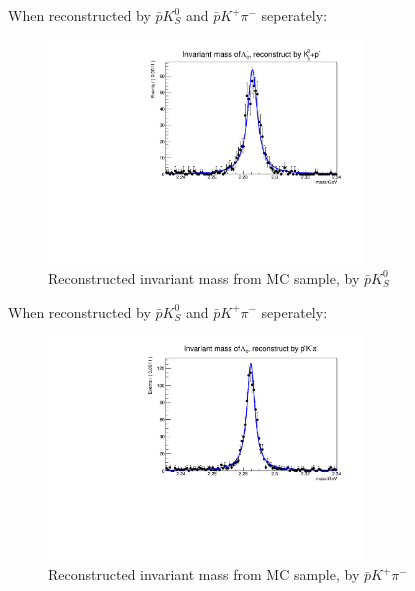 \documentclass{beamer}
\begin{document}
\begin{frame}
    When reconstructed by $\bar{p} K^0_S$ and $\bar{p} K^+ \pi^-$ seperately:
    \begin{figure}
        \centering
        \includegraphics[width = 0.75\textwidth]{k0p.pdf}
        \caption{Reconstructed invariant mass from MC sample, by $\bar{p} K^0_S$ }
        \label{fig: mBC data}
    \end{figure}
\end{frame}

\begin{frame}
    When reconstructed by $\bar{p} K^0_S$ and $\bar{p} K^+ \pi^-$ seperately:
    \begin{figure}
        \centering
        \includegraphics[width = 0.75\textwidth]{unnamed.pdf}
        \caption{Reconstructed invariant mass from MC sample, by $\bar{p} K^+ \pi^-$ }
        \label{fig: mBC data}
    \end{figure}
\end{frame}
\end{document}
